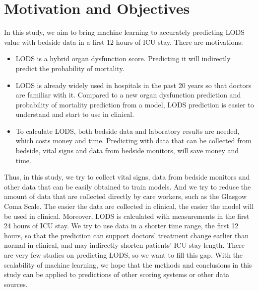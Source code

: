 \documentclass[12pt,a4paper,english
]{tunithesis}
\begin{document}
\section{Motivation and Objectives}
In this study, we aim to bring machine learning to accurately predicting LODS value with bedside data in a first 12 hours of ICU stay. There are motivations:
\begin{itemize}
\item LODS is a hybrid organ dysfunction score. Predicting it will indirectly predict the probability of mortality.
\item LODS is already widely used in hospitals in the past 20 years so that doctors are familiar with it. Compared to a new organ dysfunction prediction and probability of mortality prediction from a model, LODS prediction is easier to understand and start to use in clinical.
\item To calculate LODS, both bedside data and laboratory results are needed, which costs money and time. Predicting with data that can be collected from bedside, vital signs and data from bedside monitors, will save money and time.
\end{itemize}
Thus, in this study, we try to collect vital signs, data from bedside monitors and other data that can be easily obtained to train models. And we try to reduce the amount of data that are collected directly by care workers, such as the Glasgow Coma Scale. The easier the data are collected in clinical, the easier the model will be used in clinical. Moreover, LODS is calculated with measurements in the first 24 hours of ICU stay. We try to use data in a shorter time range, the first 12 hours, so that the prediction can support doctors' treatment change earlier than normal in clinical, and may indirectly shorten patients' ICU stay length. 
There are very few studies on predicting LODS, so we want to fill this gap. With the scalability of machine learning, we hope that the methods and conclusions in this study can be applied to predictions of other scoring systems or other data sources.
\end{document}
